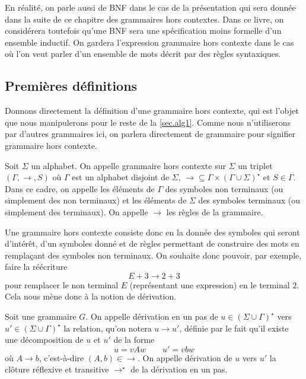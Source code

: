 \begin{remark}
  En réalité, on parle aussi de BNF dans le cas de la présentation qui sera
  donnée dans la suite de ce chapitre des grammaires hors contextes. Dans ce
  livre, on considérera toutefois qu'une BNF sera une spécification moins
  formelle d'un ensemble inductif. On gardera l'expression \og grammaire hors
  contexte\fg{} dans le cas où l'on veut parler d'un ensemble de mots décrit par
  des règles syntaxiques.
\end{remark}

\subsection{Premières définitions}

Donnons directement la définition d'une grammaire hors contexte, qui est l'objet
que nous manipulerons pour le reste de la \cref{sec.alg1}. Comme nous
n'utiliserons par d'autres grammaires ici, on parlera directement de grammaire
pour signifier \og grammaire hors contexte\fg{}.

\begin{definition}
  Soit $\Sigma$ un alphabet. On appelle grammaire hors contexte sur $\Sigma$ un
  triplet $(\Gamma,\to,S)$ où $\Gamma$ est un alphabet disjoint de $\Sigma$,
  $\to\subseteq \Gamma\times (\Gamma \cup \Sigma)^\star$ et $S \in \Gamma$. Dans
  ce cadre, on appelle les éléments de $\Gamma$ des symboles non terminaux
  (ou simplement des non terminaux) et les éléments de $\Sigma$ des symboles
  terminaux (ou simplement des terminaux). On appelle $\to$ les règles de la
  grammaire.
\end{definition}

Une grammaire hors contexte consiste donc en la donnée des symboles qui seront
d'intérêt, d'un symboles donné et de règles permettant de construire des mots
en remplaçant des symboles non terminaux. On souhaite donc pouvoir, par exemple,
faire la réécriture
\[E + 3 \to 2 + 3\]
pour remplacer le non terminal $E$ (représentant une expression) en le terminal
$2$. Cela nous mène donc à la notion de dérivation.

\begin{definition}[Dérivation]
  Soit une grammaire $G$. On appelle dérivation en un pas de
  $u \in (\Sigma\cup \Gamma)^\star$ vers $u' \in (\Sigma\cup\Gamma)^\star$ la
  relation, qu'on notera $u \to u'$, définie par le fait qu'il existe une
  décomposition de $u$ et $u'$ de la forme
  \[u = vAw\qquad u' = vbw\]
  où $A \to b$, c'est-à-dire $(A,b) \in \to$. On appelle dérivation de $u$ vers
  $u'$ la clôture réflexive et transitive $\to^\star$ de la dérivation en un pas.
\end{definition}

